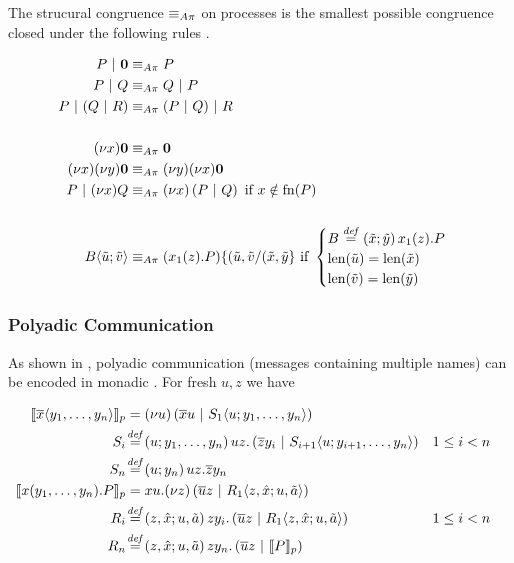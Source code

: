 The strucural congruence $\equiv_{A\pi}$ on processes
is the smallest possible congruence closed under the following rules
\cite{thati_theory_2003}.

\begin{align*}
  P \apar \anullproc
    &\astructequ P \\
  P \apar Q
    &\astructequ Q \apar P \\
  P \apar (Q \apar R)
    &\astructequ (P \apar Q) \apar R \\
  \\
  \anew{x}{\anullproc}
    &\astructequ \anullproc \\
  \anew{x}{\anew{y}{\anullproc}}
    &\astructequ \anew{y}{\anew{x}{\anullproc}} \\
  P \apar \anew{x}{Q}
    &\astructequ \anew*{x}{P \apar Q} \text{ if } x \notin \fn{P} \\
  \\
  \ains{B}{\tilde{u}}{\tilde{v}}
    &\astructequ (\arcv{x_1}{z} . P)\substitution{\subst{(\tilde{u},\tilde{v}}{(\tilde{x},\tilde{y}}}
    \text{ if }
    \begin{cases}
      \adef{B}{\tilde{x}}{\tilde{y}}{\arcv{x_1}{z} . P}\\
      \operatorname{len}(\tilde{u}) = \operatorname{len}(\tilde{x})\\
      \operatorname{len}(\tilde{v}) = \operatorname{len}(\tilde{y})
    \end{cases}
\end{align*}


\subsubsection{Polyadic Communication}

As shown in \cite{agha_algebraic_2004},
polyadic communication (messages containing multiple names)
can be encoded in monadic \actorpicalc.
For fresh $u, z$ we have

\begin{align*}
  \encPolyAP{\asnd{x}{y_1, \ldots, y_n}}
  &= \anew*{u}{\amsnd{x}{u} \apar \ains{S_1}{u}{y_1, \ldots, y_n}}
  \\
  \adef*{S_i}{u}{y_1, \ldots, y_n}
    {\amrcv{u}{z} . \parens{\amsnd{z}{y_i} \apar \ains{S_{i+1}}{u}{y_{i+1}, \ldots, y_n}}}
    && 1 \leq i < n
  \\
  \adef*{S_n}{u}{y_n}{\amrcv{u}{z} . \amsnd{z}{y_n}}
  \\
  \encPolyAP{\arcv{x}{y_1, \ldots, y_n} . P}
  &= \amrcv{x}{u} . \anew*{z}{\amsnd{u}{z} \apar \ains{R_1}{z,\hat{x}}{u,\tilde{a}}}
  \\
  \adef*{R_i}{z,\hat{x}}{u,\tilde{a}}
    {\amrcv{z}{y_i} . \parens{\amsnd{u}{z} \apar \ains{R_1}{z,\hat{x}}{u,\tilde{a}}}}
    && 1 \leq i < n
  \\
  \adef*{R_n}{z,\hat{x}}{u,\tilde{a}}
    {\amrcv{z}{y_n} . \parens{\amsnd{u}{z} \apar \encPolyAP{P}}}
\end{align*}

